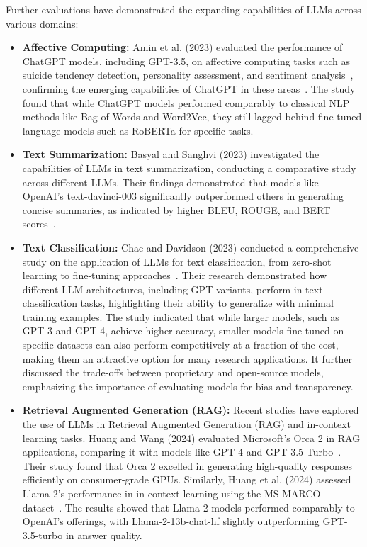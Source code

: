 Further evaluations have demonstrated the expanding capabilities of LLMs across various domains:

\begin{itemize}
    \item \textbf{Affective Computing:} Amin et al. (2023) evaluated the performance of ChatGPT models, including GPT-3.5, on affective computing tasks such as suicide tendency detection, personality assessment, and sentiment analysis~\cite{senticnet}, confirming the emerging capabilities of ChatGPT in these areas~\cite{amin2023will}. The study found that while ChatGPT models performed comparably to classical NLP methods like Bag-of-Words and Word2Vec, they still lagged behind fine-tuned language models such as RoBERTa for specific tasks.

    \item \textbf{Text Summarization:} Basyal and Sanghvi (2023) investigated the capabilities of LLMs in text summarization, conducting a comparative study across different LLMs. Their findings demonstrated that models like OpenAI's text-davinci-003 significantly outperformed others in generating concise summaries, as indicated by higher BLEU, ROUGE, and BERT scores~\cite{basyal2023text}.

    \item \textbf{Text Classification:} Chae and Davidson (2023) conducted a comprehensive study on the application of LLMs for text classification, from zero-shot learning to fine-tuning approaches~\cite{chae2023large}. Their research demonstrated how different LLM architectures, including GPT variants, perform in text classification tasks, highlighting their ability to generalize with minimal training examples. The study indicated that while larger models, such as GPT-3 and GPT-4, achieve higher accuracy, smaller models fine-tuned on specific datasets can also perform competitively at a fraction of the cost, making them an attractive option for many research applications. It further discussed the trade-offs between proprietary and open-source models, emphasizing the importance of evaluating models for bias and transparency.

    \item \textbf{Retrieval Augmented Generation (RAG):} Recent studies have explored the use of LLMs in Retrieval Augmented Generation (RAG) and in-context learning tasks. Huang and Wang (2024) evaluated Microsoft's Orca 2 in RAG applications, comparing it with models like GPT-4 and GPT-3.5-Turbo~\cite{huang2024evaluation}. Their study found that Orca 2 excelled in generating high-quality responses efficiently on consumer-grade GPUs. Similarly, Huang et al. (2024) assessed Llama 2's performance in in-context learning using the MS MARCO dataset~\cite{huang2024performance}. The results showed that Llama-2 models performed comparably to OpenAI's offerings, with Llama-2-13b-chat-hf slightly outperforming GPT-3.5-turbo in answer quality.
\end{itemize}
